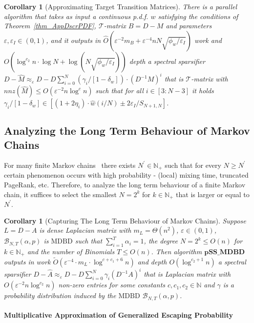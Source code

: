 \documentclass[11pt]{article}
\newcommand{\phiw}{\phi_{w}}
\newcommand{\epsI}{\eps_{I}}
\newcommand{\MDBD}{\mathrm{MDBD}}
\newcommand{\GL}{\mathcal{T}}
\newcommand{\BNTap}{\mathcal{B}_{N,T}(\alpha,p)}
\newcommand{\pSSMDBD}{\mathrm{\mathbf{pSS\_MDBD}}}
\newcommand{\wO}{\widetilde{O}}
\newcommand{\hM}{\widehat{M}}
\newcommand{\hA}{\widehat{A}}
\newcommand{\hO}{\widehat{O}}
\newcommand{\hw}{\widehat{w}}
\newcommand{\Di}{D^{-1}}
\newcommand{\prm}{\prime}
\newcommand{\N}{\mathbb{N}}
\newcommand{\eps}{\epsilon}
\renewcommand{\leq}{\leqslant}
\renewcommand{\geq}{\geqslant}
\renewcommand{\eps}{\varepsilon}
\newtheorem{cor}[thm]{Corollary}
\numberwithin{thm}{section}
\begin{document}
\begin{cor}[Approximating Target Transition Matrices]
There is a parallel algorithm that takes as input a continuous p.d.f. $w$ satisfying the conditions of Theorem~\ref{thm_AppDscrPDF}, $\GL$-matrix $B=D-M$ and parameters $\eps,\epsI\in(0,1)$, and it outputs in $\hO(\eps^{-2}m_B + \eps^{-4}nN\sqrt{\phiw/\epsI})$ work and $O(\log^{c_2}n\cdot\log N+ \log(N\sqrt{\phiw/\epsI}))$ depth a spectral sparsifier $D-\hM \approx_{\eps}D-D\sum_{i=0}^{N}(\gamma_{i}/[1-\delta_{w}])\cdot(\Di M)^{i}$ that is $\GL$-matrix with $nnz(\hM)\leq O(\eps^{-2}n\log^{c} n)$ such that for all $i\in[3:N-3]$ it holds
$\gamma_{i}/[1-\delta_{w}]\in [(1+2\eta_{i})\cdot\hw(i/N) \pm 2\eps_{I}/S_{N+1,N}]$.
\end{cor}


\subsection{Analyzing the Long Term Behaviour of Markov Chains}\label{subsec:Apps}

For many finite Markov chains~\cite{SJ89,ACL06,OT12,KS14} there exists $N^\prm\in\N_+$ such that for every $N\geq N^\prm$ certain phenomenon occurs with high probability - (local) mixing time, truncated PageRank, etc. Therefore, to analyze the long term behaviour of a finite Markov chain, it suffices to select the smallest $N=2^k$ for $k\in\N_+$ that is larger or equal to $N^\prm$.

\begin{cor}[Capturing The Long Term Behaviour of Markov Chains]\label{cor:denseTmtx}
Suppose $L=D-A$ is dense Laplacian matrix with $m_{L}=\Theta(n^{2})$, $\eps\in(0,1)$, $\BNTap$ is $\MDBD$ such that $\sum_{i=1}^{T}\alpha_{i}=1$, the degree $N=2^k\leq O(n)$ for $k\in\N_+$ and the number of Binomials $T\leq O(n)$. Then algorithm $\pSSMDBD$ outputs in work $\wO(\eps^{-4}\cdot m_L\cdot\log^{c+c_1+6}n)$ and depth $O(\log^{c_2+1}n)$ a spectral sparsifier $D-\hA \approx_{\eps}D-D\sum_{i=0}^{N}\gamma_{i}(\Di A)^{i}$ that is Laplacian matrix with $O(\eps^{-2}n\log^{c_2} n)$ non-zero entries for some constants $c,c_1,c_2\in\N$ and $\gamma$ is a probability distribution induced by the $\MDBD$ $\BNTap$.
\end{cor}


\paragraph*{Multiplicative Approximation of Generalized Escaping Probability}
\end{document}
